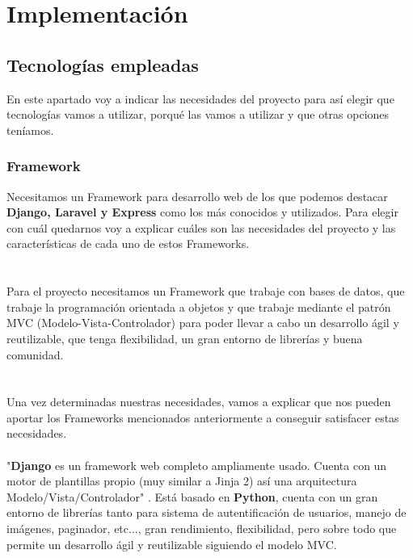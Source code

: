 \chapter{Implementación} \label{sec:implementacion}

\section{Tecnologías empleadas} \label{sec:tecnologias}

En este apartado voy a indicar las necesidades del proyecto para así elegir que tecnologías vamos a utilizar, porqué las vamos a utilizar y que otras opciones teníamos.

\subsection{Framework}

Necesitamos un Framework para desarrollo web de los que podemos destacar \textbf{Django, Laravel y Express} como los más conocidos y utilizados.
Para elegir con cuál quedarnos voy a explicar cuáles son las necesidades del proyecto y las características de cada uno de estos Frameworks.\\\\
\\
Para el proyecto necesitamos un Framework que trabaje con bases de datos, que trabaje la programación orientada a objetos y que trabaje 
mediante el patrón MVC (Modelo-Vista-Controlador) para poder llevar a cabo un desarrollo ágil y reutilizable, que tenga flexibilidad, 
un gran entorno de librerías y buena comunidad.\\
\\\\
Una vez determinadas nuestras necesidades, vamos a explicar que nos pueden aportar los Frameworks mencionados anteriormente a conseguir satisfacer estas necesidades.\\\\

"\textbf{Django} es un framework web completo ampliamente usado. Cuenta con un motor de plantillas propio (muy similar a Jinja 2) así una arquitectura Modelo/Vista/Controlador" \cite{django}.
Está basado en \textbf{Python}, cuenta con un gran entorno de librerías tanto para sistema de autentificación de usuarios, manejo de imágenes, paginador, etc..., gran rendimiento, flexibilidad,
pero sobre todo que permite un desarrollo ágil y reutilizable siguiendo el modelo MVC.\\ \\

